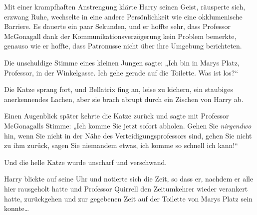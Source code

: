 Mit einer krampfhaften Anstrengung klärte Harry seinen Geist, räusperte sich, erzwang Ruhe, wechselte in eine andere Persönlichkeit wie eine okklumenische Barriere. Es dauerte ein paar Sekunden, und er hoffte sehr, dass Professor McGonagall dank der Kommunikationsverzögerung kein Problem bemerkte, genauso wie er hoffte, dass Patronusse nicht über ihre Umgebung berichteten.

Die unschuldige Stimme eines kleinen Jungen sagte: „Ich bin in Marys Platz, Professor, in der Winkelgasse. Ich gehe gerade auf die Toilette. Was ist los?“

Die Katze sprang fort, und Bellatrix fing an, leise zu kichern, ein staubiges anerkennendes Lachen, aber sie brach abrupt durch ein Zischen von Harry ab.

Einen Augenblick später kehrte die Katze zurück und sagte mit Professor McGonagalls Stimme: „Ich komme Sie jetzt sofort abholen. Gehen Sie \emph{nirgendwo} hin, wenn Sie nicht in der Nähe des Verteidigungsprofessors sind, gehen Sie nicht zu ihm zurück, sagen Sie niemandem etwas, ich komme so schnell ich kann!“

Und die helle Katze wurde unscharf und verschwand.

Harry blickte auf seine Uhr und notierte sich die Zeit, so dass er, nachdem er alle hier rausgeholt hatte und Professor Quirrell den Zeitumkehrer wieder verankert hatte, zurückgehen und zur gegebenen Zeit auf der Toilette von Marys Platz sein konnte…

